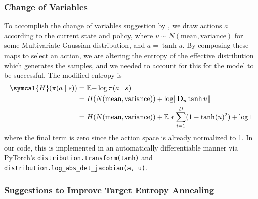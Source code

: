 \documentclass[base]{subfiles}
\begin{document}
\subsubsection{Change of Variables}
To accomplish the change of variables suggestion by \cite{sac}, we draw actions \(a\) according to the current state and policy, where \(u \sim N(\text{mean}, \text{variance})\) for some Multivariate Gaussian distribution, and 
\(a = \tanh u\).
By composing these maps to select an action, we are altering the entropy of the effective distribution which generates the samples, and we needed to account for this for the model to be successful.
The modified entropy is
\begin{align*}
\symcal{H} (\pi(a \mid s)) & = \mathbb{E}{- \log \pi (a \mid s)} \\
& = H (N(\text{mean}, \text{variance})) + \log \norm{\mathbf{D}_u \tanh u} \\
& = H (N(\text{mean}, \text{variance})) +  \mathbb{E}*{\sum_{i = 1}^D (1 - \tanh(u)^2)} + \log 1
\end{align*}
where the final term is zero since the action space is already normalized to 1.
In our code, this is implemented in an automatically differentiable manner via PyTorch's \verb|distribution.transform(tanh)| and \verb|distribution.log_abs_det_jacobian(a, u)|.


\subsubsection{Suggestions to Improve Target Entropy Annealing}
\end{document}
